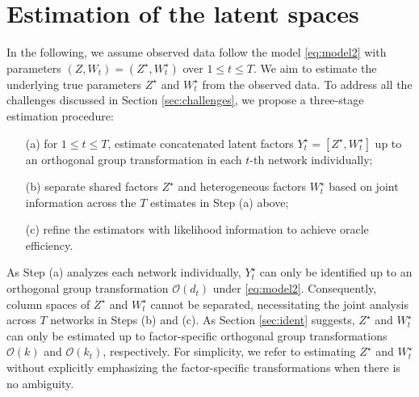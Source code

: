 \documentclass[12pt]{article}
\begin{document}
\section{Estimation of the latent spaces} \label{sec:estall}

In the following, we assume observed data  follow the model \eqref{eq:model2} with parameters $(Z,W_t)=(Z^{\star},W_t^{\star})$ over $1\leqslant t \leqslant T$. 
We  aim to estimate the underlying true parameters $Z^{\star}$ and $ W^{\star}_t$ from the observed data. 
To address all the challenges discussed in Section \ref{sec:challenges},  we propose a three-stage estimation procedure:

\begin{itemize}
\setlength{\itemsep}{0pt} 
    \item[(a)] for  $1\leqslant t\leqslant T$,  estimate concatenated latent factors  $Y_t^{\star}=[Z^{\star}, W_t^{\star}]$ up to an orthogonal group transformation in each $t$-th network  individually;  
    \item[(b)] separate  shared factors $Z^{\star}$ and heterogeneous factors ${W}_t^{\star}$  based on joint information across the $T$ estimates in Step (a) above;   
    \item[(c)] refine the estimators with likelihood information to achieve oracle efficiency.  
\end{itemize} 
{As Step (a) analyzes each network individually,   $Y_t^{\star}$ can only be identified  up to an orthogonal group  transformation $\mathcal{O}(d_t)$ under \eqref{eq:model2}. Consequently, column spaces of $Z^{\star}$ and $W_t^{\star}$ cannot be separated, necessitating the joint analysis across $T$ networks in Steps (b) and (c). 
% 
As Section \ref{sec:ident} suggests, $Z^{\star}$ and  $W_t^{\star}$ can only be estimated up to  factor-specific orthogonal group transformations $\mathcal{O}(k)$ and $\mathcal{O}(k_t)$, respectively. 
For simplicity, we refer to estimating  $Z^{\star}$ and  $W_t^{\star}$ without  explicitly emphasizing the factor-specific  transformations when there is no ambiguity.} 
\end{document}
